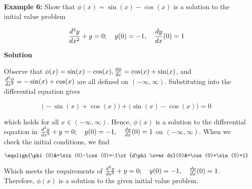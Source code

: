 \nopagenumbers
{\bf Example 6:} Show that $\phi(x)=\sin(x)-\cos(x)$ is a solution to the initial value problem

$${d^2y\over dx^2}+y=0;\quad y(0)=-1,\quad {dy\over dx}(0)=1$$


\vskip 10pt
{\bf Solution}

\vskip 6pt
Observe that $\phi(x)=\sin(x)-\cos(x),{d\phi\over dx}=\cos(x)+\sin(x)$, and ${d^2\phi\over dx^2}=-\sin(x)+\cos(x)$ are all defined on $(-\infty,\infty)$. Substituting into the differential equation gives

$$\biggl(-\sin(x)+\cos(x)\biggr)+\biggl(\sin(x)-\cos(x)\biggr)=0$$

which holds for all $x\in (-\infty,\infty)$. Hence, $\phi(x)$ is a solution to the differential equation in ${d^2y\over dx^2}+y=0;\quad y(0)=-1,\quad {dy\over dx}(0)=1$ on $(-\infty,\infty)$. When we check the initial conditions, we find

$$\eqalign{\phi(0)&=\sin(0)-\cos(0)=-1\cr
	{d\phi\over dx}(0)&=\cos(0)+\sin(0)=1}$$

Which meets the requirements of ${d^2y\over dx^2}+y=0;\quad y(0)=-1,\quad {dy\over dx}(0)=1$. Therefore, $\phi(x)$ is a solution to the given initial value problem.



\vfill\eject
\bye
